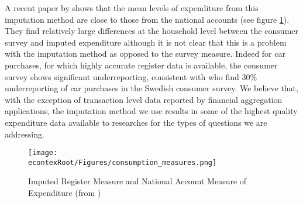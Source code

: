\documentclass[titlepage]{\econtex}\newcommand{\texname}{ConsumptionHeterogeneity}
\begin{document}
A recent paper by \cite{abildgren_consistency_2018} shows that the mean levels of expenditure from this imputation method are close to those from the national accounts (see figure \ref{fig:ConsumptionMeasures}). They find relatively large differences at the household level between the consumer survey and imputed expenditure although it is not clear that this is a problem with the imputation method as opposed to the survey measure. Indeed for car purchases, for which highly accurate register data is available, the consumer survey shows significant underreporting, consistent with \cite{koijen_judging_2014} who find 30\% underreporting of car purchases in the Swedish consumer survey. We believe that, with the exception of transaction level data reported by financial aggregation applications, the imputation method we use results in some of the highest quality expenditure data available to researches for the types of questions we are addressing.
\begin{figure} 
	\begin{centering}
		\texttt{[image: \\econtexRoot/Figures/consumption\_measures.png]} 
		\caption{Imputed Register Measure and National Account Measure of Expenditure (from \cite{abildgren_consistency_2018})}
		\label{fig:ConsumptionMeasures}
	\end{centering}
\end{figure}
\end{document}
